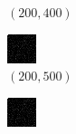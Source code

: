 \documentclass[a4paper, landscape]{article}
\begin{document}
\begin{figure}[H]
\begin{subfigure}{0.07\linewidth}
        \caption*{$(200, 400)$}
    \end{subfigure}
    \begin{subfigure}{0.07\linewidth}
        \centering
        \includegraphics[width=\linewidth]{iht/k = 200, m = 500.png}
        \caption*{$(200, 500)$}
    \end{subfigure}
    \begin{subfigure}{0.07\linewidth}
        \centering
        \includegraphics[width=\linewidth]{iht/k = 200, m = 600.png}

\end{subfigure}
\end{figure}
\end{document}
